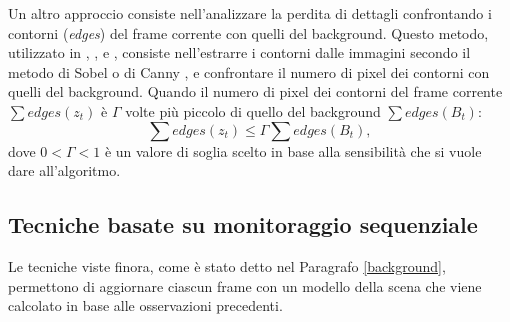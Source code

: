 Un altro approccio consiste nell'analizzare la perdita di dettagli confrontando i contorni (\textit{edges}) del frame corrente con quelli del background.
Questo metodo, utilizzato in \cite{ellwart2012camera}, \cite{gil2007automatic}, \cite{harasse2004automated} e \cite{kryjak2012fpga}, consiste nell'estrarre i contorni dalle immagini secondo il metodo di Sobel \cite{sobel19683x3} o di Canny \cite{canny1986computational}, e confrontare il numero di pixel dei contorni con quelli del background. 
Quando il numero di pixel dei contorni del frame corrente $\sum edges(z_t)$ \`e $\Gamma$ volte pi\`u piccolo di quello del background $\sum edges(B_t)$:
\[ \sum edges(z_t) \leq \Gamma \sum edges(B_t), \]
dove $0<\Gamma<1$ \`e  un valore di soglia scelto in base alla sensibilit\`a che si vuole dare all'algoritmo.
\subsection{Tecniche basate su monitoraggio sequenziale}
Le tecniche viste finora, come \`e stato detto nel Paragrafo \ref{background}, permettono di aggiornare ciascun frame con un modello della scena che viene calcolato in base alle osservazioni precedenti.
